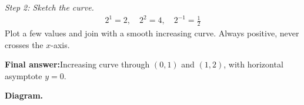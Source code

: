 \documentclass[11pt]{article}
\begin{document}
\textit{Step 2: Sketch the curve.}
\[\begin{gathered}
2^{1} = 2, \quad 2^{2} = 4, \quad 2^{-1} = \tfrac{1}{2}
\end{gathered}\]
Plot a few values and join with a smooth increasing curve. Always positive, never crosses the \( x \)-axis.

\begin{answerbox}
\textbf{Final answer:}\quad Increasing curve through \(\displaystyle (0, 1)\) and \(\displaystyle (1, 2)\), with horizontal asymptote \(\displaystyle  y = 0 \).
\end{answerbox}
\textbf{Diagram.}

\begin{center}
\end{center}
\end{document}

